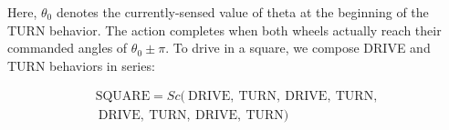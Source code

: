\documentclass[conference]{IEEEtran}
\theoremstyle{definition}
\begin{document}
Here, \(\theta_0\) denotes the currently-sensed value of theta at the beginning of
the TURN behavior.
The action completes when both wheels actually reach their commanded angles of \(\theta_0\pm\pi\). To drive in a square, we compose DRIVE and TURN behaviors in series:

\begin{align*}
\mathrm{SQUARE} = Sc (~\mathrm{DRIVE},~\mathrm{TURN},~\mathrm{DRIVE},~\mathrm{TURN},\\
~\mathrm{DRIVE},~\mathrm{TURN},~\mathrm{DRIVE},~\mathrm{TURN} )
\end{align*}

% 
% 
\end{document}
